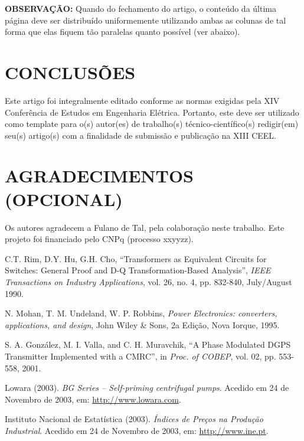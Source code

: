 \documentclass{ceel}
\begin{document}
\begin{multicols}{2}
\textbf{OBSERVAÇÃO: }Quando do fechamento do artigo, o conteúdo da última página deve ser distribuído uniformemente utilizando ambas as colunas de tal forma que elas fiquem tão paralelas quanto possível (ver abaixo).
\section{CONCLUSÕES}
Este artigo foi integralmente editado conforme as normas exigidas pela XIV Conferência de Estudos em Engenharia Elétrica. Portanto, este deve ser utilizado como template para o(s) autor(es) de trabalho(s) técnico-científico(s) redigir(em) seu(s) artigo(s) com a finalidade de submissão e publicação na XIII CEEL.
\section*{ AGRADECIMENTOS (OPCIONAL)}
Os autores agradecem a Fulano de Tal, pela colaboração neste trabalho. Este projeto foi financiado pelo CNPq (processo xxyyzz).
\begin{thebibliography}{9} %

  C.T. Rim, D.Y. Hu, G.H. Cho,
   “Transformers as Equivalent Circuits for Switches: General Proof and D-Q Transformation-Based Analysis”,
   \emph{ IEEE Transactions on Industry Applications}, vol. 26, no. 4, pp. 832-840, July/August 1990.
   
 N. Mohan, T. M. Undeland, W. P. Robbins, 
 \emph{Power Electronics: converters, applications, and design}, 
 John Wiley \& Sons, 2a Edição, Nova Iorque, 1995.
 
S. A. González, M. I. Valla, and C. H. Muravchik, 
“A Phase Modulated DGPS Transmitter Implemented with a CMRC”, 
in \emph{Proc. of COBEP}, vol. 02, pp. 553-558, 2001.

Lowara (2003). \emph{BG Series – Self-priming centrifugal pumps}. Acedido em 24 de Novembro de 2003, em: \url{http://www.lowara.com}.

	Instituto Nacional de Estatística (2003). \emph{Índices de Preços na Produção Industrial}. Acedido em 24 de Novembro de 2003, em: \url{http://www.ine.pt}.

\end{thebibliography}


\end{multicols}
\end{document}
